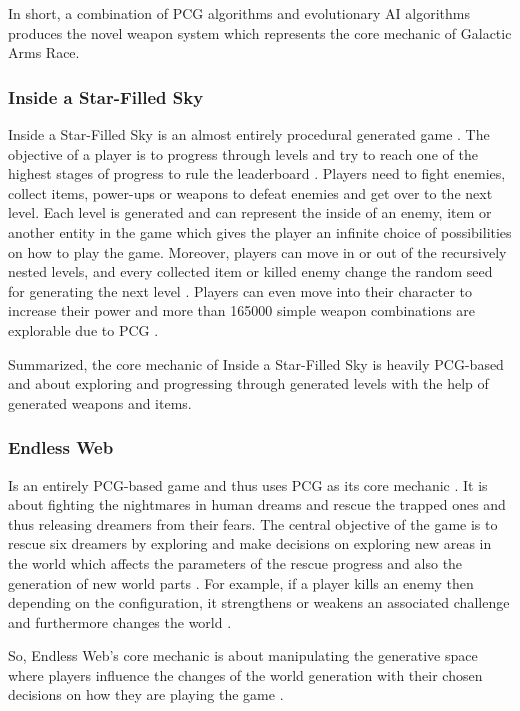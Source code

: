 \documentclass[MGS,Master,english]{twbook}%
\begin{document}
In short, a combination of \ac{PCG} algorithms and evolutionary \ac{AI} algorithms produces the novel weapon system which represents the core mechanic of Galactic Arms Race.

\subsubsection{Inside a Star-Filled Sky}
Inside a Star-Filled Sky is an almost entirely procedural generated game \cite{game::insideAStarFilledSky}. The objective of a player is to progress through levels and try to reach one of the highest stages of progress to rule the leaderboard \cite{game::insideAStarFilledSky}. Players need to fight enemies, collect items, power-ups or weapons to defeat enemies and get over to the next level. Each level is generated and can represent the inside of an enemy, item or another entity in the game which gives the player an infinite choice of possibilities on how to play the game. Moreover, players can move in or out of the recursively nested levels, and every collected item or killed enemy change the random seed for generating the next level \cite{pcg::endlessWeb}. Players can even move into their character to increase their power and more than 165000 simple weapon combinations are explorable due to \ac{PCG} \cite{game::insideAStarFilledSky}.

Summarized, the core mechanic of Inside a Star-Filled Sky is heavily \ac{PCG}-based and about exploring and progressing through generated levels with the help of generated weapons and items.

\subsubsection{Endless Web}
Is an entirely \ac{PCG}-based game and thus uses \ac{PCG} as its core mechanic \cite{pcg::endlessWeb}. It is about fighting the nightmares in human dreams and rescue the trapped ones and thus releasing dreamers from their fears. The central objective of the game is to rescue six dreamers by exploring and make decisions on exploring new areas in the world which affects the parameters of the rescue progress and also the generation of new world parts \cite{pcg::endlessWeb}. For example, if a player kills an enemy then depending on the configuration, it strengthens or weakens an associated challenge and furthermore changes the world \cite{pcg::endlessWeb}.

So, Endless Web's core mechanic is about manipulating the generative space where players influence the changes of the world generation with their chosen decisions on how they are playing the game \cite{pcg::endlessWeb}.
\end{document}
